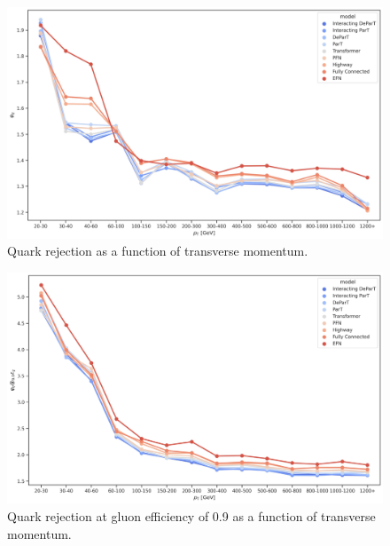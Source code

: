 \begin{figure}[htb]
    \centering
    \includegraphics[width=1\linewidth]{src/plots/results/pT_dep/quark_rejection.jpg}
    \caption{Quark rejection as a function of transverse momentum.}
    \label{fig:quark_rej_pt}
\end{figure}

\begin{figure}[htb]
    \centering
    \includegraphics[width=1\linewidth]{src/plots/results/pT_dep/quark_rej_at_gluon_eff_0.9.jpg}
    \caption{Quark rejection at gluon efficiency of 0.9 as a function of transverse momentum.}
    \label{fig:quark_rej_at_gluon_eff_0.9_pt}
\end{figure}

